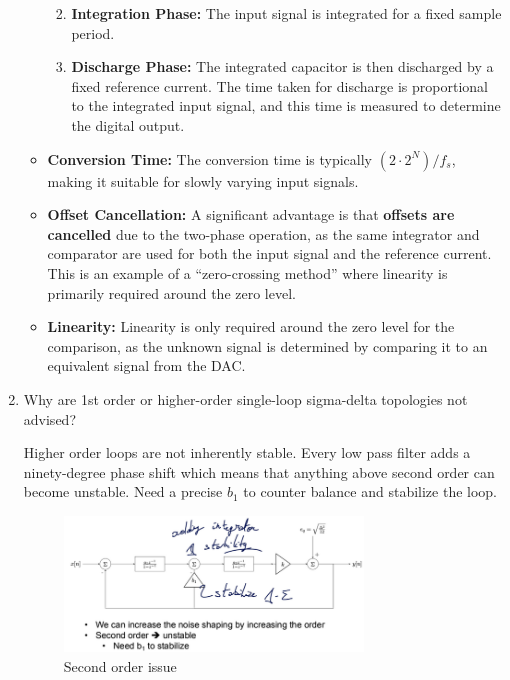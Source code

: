 \documentclass[
  a4paper,
]{article}
\providecommand{\tightlist}{%
  \setlength{\itemsep}{0pt}\setlength{\parskip}{0pt}}
\begin{document}
\begin{enumerate}
\begin{itemize}
    \begin{enumerate}
    \def\labelenumii{\arabic{enumii}.}
    \tightlist
    \item
      \textbf{Integration Phase:} The input signal is integrated for a
      fixed sample period.
    \item
      \textbf{Discharge Phase:} The integrated capacitor is then
      discharged by a fixed reference current. The time taken for
      discharge is proportional to the integrated input signal, and this
      time is measured to determine the digital output.
    \end{enumerate}
  \item
    \textbf{Conversion Time:} The conversion time is typically
    \textbf{\((2 \cdot 2^N)/f_s\)}, making it suitable for slowly
    varying input signals.
  \item
    \textbf{Offset Cancellation:} A significant advantage is that
    \textbf{offsets are cancelled} due to the two-phase operation, as
    the same integrator and comparator are used for both the input
    signal and the reference current. This is an example of a
    ``zero-crossing method'' where linearity is primarily required
    around the zero level.
  \item
    \textbf{Linearity:} Linearity is only required around the zero level
    for the comparison, as the unknown signal is determined by comparing
    it to an equivalent signal from the DAC.
  \end{itemize}
\item
  Why are 1st order or higher-order single-loop sigma-delta topologies
  not advised?

  Higher order loops are not inherently stable. Every low pass filter
  adds a ninety-degree phase shift which means that anything above
  second order can become unstable. Need a precise \(b_1\) to counter
  balance and stabilize the loop.

  \begin{figure}
  \centering
  \includegraphics[width=0.75\textwidth,height=\textheight]{image-4.png}
  \caption{Second order issue}
  \end{figure}


\end{enumerate}
\end{document}
